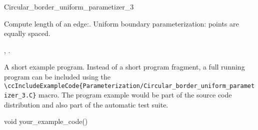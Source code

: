 \begin{ccRefClass}{Circular_border_uniform_parametizer_3}


\ccOperations

{
Compute length of an edge:.
Uniform boundary parameterization: points are equally spaced.
}


\ccSeeAlso

,
.

\ccExample

A short example program.
Instead of a short program fragment, a full running program can be
included using the 
\verb|\ccIncludeExampleCode{Parameterization/Circular_border_uniform_parametizer_3.C}| 
macro. The program example would be part of the source code distribution and
also part of the automatic test suite.

\begin{ccExampleCode}
void your_example_code() {
}
\end{ccExampleCode}


\end{ccRefClass}


